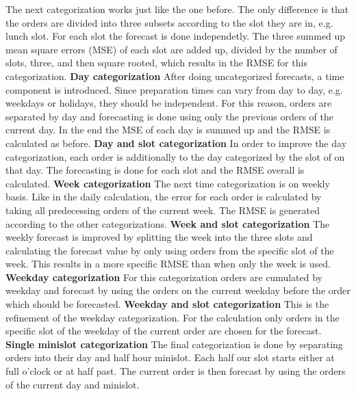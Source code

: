 The next categorization works just like the one before. The only difference is that the orders are divided into three subsets according to the slot they are in, e.g. lunch slot. For each slot the forecast is done independetly. The three summed up mean square errors (MSE) of each slot are added up, divided by the number of slots, three, and then square rooted, which results in the RMSE for this categorization.
\newline\newline\textbf{Day categorization}\newline
After doing uncategorized forecasts, a time component is introduced. Since preparation times can vary from day to day, e.g. weekdays or holidays, they should be independent. For this reason, orders are separated by day and forecasting is done using only the previous orders of the current day. In the end the MSE of each day is summed up and the RMSE is calculated as before.
\newline\newline\textbf{Day and slot categorization}\newline
In order to improve the day categorization, each order is additionally to the day categorized by the slot of on that day. The forecasting is done for each slot and the RMSE overall is calculated.
\newline\newline\textbf{Week categorization}\newline
The next time categorization is on weekly basis. Like in the daily calculation, the error for each order is calculated by taking all predecessing orders of the current week. The RMSE is generated according to the other categorizations.
\newline\newline\textbf{Week and slot categorization}\newline
The weekly forecast is improved by splitting the week into the three slots and calculating the forecast value by only using orders from the specific slot of the week. This results in a more specific RMSE than when only the week is used.
\newline\newline\textbf{Weekday categorization}\newline
For this categorization orders are cumulated by weekday and forecast by using the orders on the current weekday before the order which should be forecasted.
\newline\newline\textbf{Weekday and slot categorization}\newline
This is the refinement of the weekday categorization. For the calculation only orders in the specific slot of the weekday of the current order are chosen for the forecast.
\newline\newline\textbf{Single minislot categorization}\newline
The final categorization is done by separating orders into their day and half hour minislot. Each half our slot starts either at full o'clock or at half past. The current order is then forecast by using the orders of the current day and minislot.\newline

